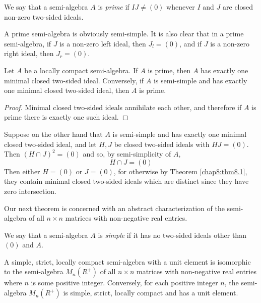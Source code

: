 \begin{Definition} %
  We say that a semi-algebra $A$ is {\em prime} if $IJ \neq (0)$
  whenever $I$ and $J$ are closed non-zero two-sided ideals. 
\end{Definition}

A prime semi-algebra is obviously semi-simple. It is also clear that in
a prime semi-algebra, if $J$ is a non-zero left ideal, then $J_l=(0)$,
and if $J$ is a non-zero right ideal, then $J_r=(0)$.\pageoriginale 

\begin{thmm} %
  Let $A$ be a locally compact semi-algebra. If $A$ is prime, then $A$
  has exactly one minimal closed two-sided ideal. Conversely, if $A$
  is semi-simple and has exactly one minimal closed two-sided ideal,
  then $A$ is prime. 
\end{thmm}

\begin{proof}
  Minimal closed two-sided ideals annihilate each other, and therefore
  if $A$ is prime there is exactly one such ideal. 
\end{proof}

Suppose on the other hand that $A$ is semi-simple and has exactly one
minimal closed two-sided ideal, and let $H,J$ be closed two-sided
ideals with $HJ=(0)$. Then $(H \cap J)^2=(0)$ and so, by
semi-simplicity of $A$, 
$$
H \cap J=(0)
$$
Then either $H=(0)$ or $J=(0)$, for otherwise by Theorem
\ref{chap8:thm8.1}, they 
contain minimal closed two-sided ideals which are distinct since they
have zero intersection. 

Our next theorem is concerned with an abstract characterization of
the semi-algebra of all $n \times n$ matrices with non-negative real
entries. 

\begin{Definition} %
  We say that a semi-algebra $A$ is {\em simple} if it has no
  two-sided ideals other than $(0)$ and $A$. 
\end{Definition}

\begin{thmm} %
  A simple, strict, locally compact semi-algebra with a unit element
  is isomorphic to the semi-algebra $M_n(R^+)$ of all $n \times n$
  matrices with non-negative real entries where $n$ is some
  positive\pageoriginale 
  integer. Conversely, for each positive integer $n$, the semi-algebra
  $M_n(R^+)$ is simple, strict, locally compact and has a unit
  element. 
\end{thmm}

